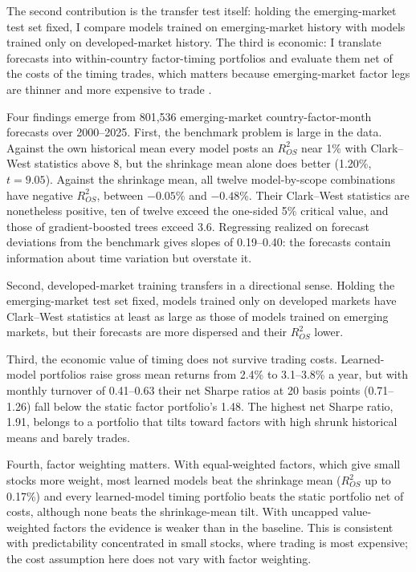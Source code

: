 \documentclass[11pt]{article}
\begin{document}
The second contribution is the transfer test itself: holding the emerging-market test set fixed, I compare models trained on emerging-market history with models trained only on developed-market history. The third is economic: I translate forecasts into within-country factor-timing portfolios and evaluate them net of the costs of the timing trades, which matters because emerging-market factor legs are thinner and more expensive to trade \citep{novymarx2016taxonomy}.

Four findings emerge from 801,536 emerging-market country-factor-month forecasts over 2000--2025. First, the benchmark problem is large in the data. Against the own historical mean every model posts an $R^2_{OS}$ near 1\% with Clark--West statistics above 8, but the shrinkage mean alone does better (1.20\%, $t = 9.05$). Against the shrinkage mean, all twelve model-by-scope combinations have negative $R^2_{OS}$, between $-0.05$\% and $-0.48$\%. Their Clark--West statistics are nonetheless positive, ten of twelve exceed the one-sided 5\% critical value, and those of gradient-boosted trees exceed 3.6. Regressing realized on forecast deviations from the benchmark gives slopes of 0.19--0.40: the forecasts contain information about time variation but overstate it.

Second, developed-market training transfers in a directional sense. Holding the emerging-market test set fixed, models trained only on developed markets have Clark--West statistics at least as large as those of models trained on emerging markets, but their forecasts are more dispersed and their $R^2_{OS}$ lower.

Third, the economic value of timing does not survive trading costs. Learned-model portfolios raise gross mean returns from 2.4\% to 3.1--3.8\% a year, but with monthly turnover of 0.41--0.63 their net Sharpe ratios at 20 basis points (0.71--1.26) fall below the static factor portfolio's 1.48. The highest net Sharpe ratio, 1.91, belongs to a portfolio that tilts toward factors with high shrunk historical means and barely trades.

Fourth, factor weighting matters. With equal-weighted factors, which give small stocks more weight, most learned models beat the shrinkage mean ($R^2_{OS}$ up to 0.17\%) and every learned-model timing portfolio beats the static portfolio net of costs, although none beats the shrinkage-mean tilt. With uncapped value-weighted factors the evidence is weaker than in the baseline. This is consistent with predictability concentrated in small stocks, where trading is most expensive; the cost assumption here does not vary with factor weighting.
\end{document}
